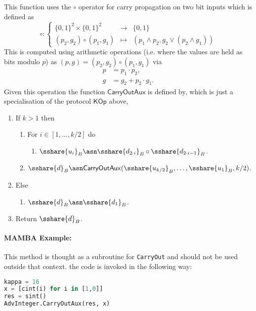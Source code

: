 This function uses the $\circ$ operator for carry propagation on two
bit inputs which is defined as
\[  \circ:  \left\{ \begin{array}{ccc}
    \{0,1\}^2 \times \{0,1\}^2 & \longrightarrow & \{0,1\} \\
    (p_2,g_2) \circ (p_1,g_1)  & \longmapsto     &
    (p_1 \wedge p_2, g_2 \vee (p_2 \wedge g_1))
  \end{array} \right.
\]
This is computed using arithmetic operations (i.e. where the values are
held as bits modulo $p$) as $(p,g) = (p_2,g_2) \circ (p_1,g_1)$ via
\begin{align*}
  p & = p_1 \cdot p_2,       \\
  g & = g_2 + p_2 \cdot g_1.
\end{align*}
Given this operation the function $\mathsf{CarryOutAux}$ is defined by,
which is just a specialisation of the protocol $\mathsf{KOp}$ above,
\begin{enumerate}
  \item If $k>1$ then
        \begin{enumerate}
          \item For $i \in [1,\ldots,k/2]$ do
                \begin{enumerate}
                  \item $\sshare{u_i}_B \asn \sshare{d_{2\cdot i}}_B \circ \sshare{d_{2 \cdot i-1}}_B$.
                \end{enumerate}
          \item $\sshare{d}_B \asn \mathsf{CarryOutAux}(\sshare{u_{k/2}}_B,\ldots,\sshare{u_1}_B,k/2)$.
        \end{enumerate}
  \item Else
        \begin{enumerate}
          \item $\sshare{d}_B \asn \sshare{d_1}_B$.
        \end{enumerate}
  \item Return $\sshare{d}_B$.
\end{enumerate}
\paragraph{MAMBA Example:} This method is thought as a subroutine for \verb|CarryOut| and should not be used outside that context. the code is invoked in the following way:
\begin{lstlisting}[language={python}]
kappa = 16
x = [cint(i) for i in [1,0]]
res = sint()
AdvInteger.CarryOutAux(res, x)
\end{lstlisting}


